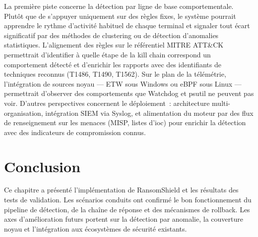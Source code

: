 La première piste concerne la détection par ligne de base comportementale. Plutôt que de s'appuyer uniquement sur des règles fixes, le système pourrait apprendre le rythme d'activité habituel de chaque terminal et signaler tout écart significatif par des méthodes de clustering ou de détection d'anomalies statistiques. L'alignement des règles sur le référentiel MITRE ATT\&CK \cite{mitreAttack} permettrait d'identifier à quelle étape de la kill chain correspond un comportement détecté et d'enrichir les rapports avec des identifiants de techniques reconnus (T1486, T1490, T1562). Sur le plan de la télémétrie, l'intégration de sources noyau --- ETW sous Windows ou eBPF sous Linux --- permettrait d'observer des comportements que Watchdog et psutil ne peuvent pas voir. D'autres perspectives concernent le déploiement~: architecture multi-organisation, intégration SIEM via Syslog, et alimentation du moteur par des flux de renseignement sur les menaces (MISP, listes d'\gls{ioc}) pour enrichir la détection avec des indicateurs de compromission connus.

{}
\section*{Conclusion}

Ce chapitre a présenté l'implémentation de RansomShield et les résultats des tests de validation. Les scénarios conduits ont confirmé le bon fonctionnement du pipeline de détection, de la chaîne de réponse et des mécanismes de rollback. Les axes d'amélioration futurs portent sur la détection par anomalie, la couverture noyau et l'intégration aux écosystèmes de sécurité existants.